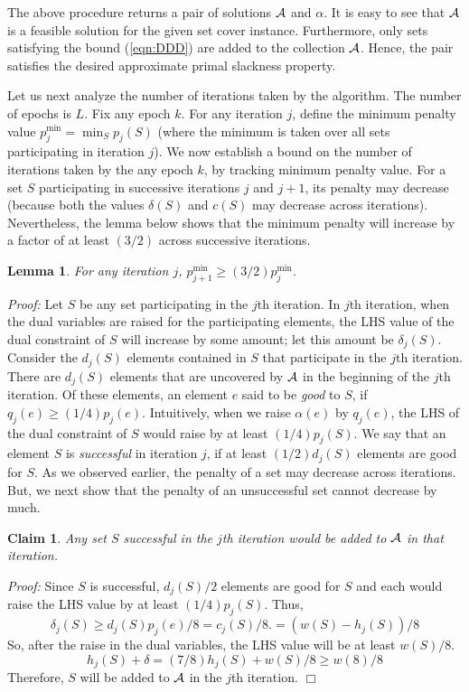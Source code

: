 \documentclass[11pt]{article}
\newtheorem{lemma}[theorem]{\bf Lemma}
\newtheorem{claim}[theorem]{\bf Claim}
\newcommand {\myproof} {{\it Proof: }}
\newcommand {\qed} {\hfill$\Box$}
\newcommand{\calA} {{\cal A}}
\begin{document}
The above procedure returns a pair of solutions $\calA$ and $\alpha$.
It is easy to see that $\calA$ is a feasible solution  for the given
set cover instance. Furthermore, only sets satisfying the bound (\ref{eqn:DDD})
are added to the collection $\calA$. Hence, the pair satisfies the
desired approximate primal slackness property.

Let us next analyze the number of iterations taken by the algorithm.
The number of epochs is $L$. Fix any epoch $k$.
For any iteration $j$, define the minimum penalty value $p_j^{\min} = \min_{S} p_j(S)$ 
(where the minimum is taken over all sets participating in iteration $j$). 
We now establish a bound on the number of iterations taken by the any epoch $k$,
by tracking minimum penalty value.
For a set $S$ participating in successive iterations $j$ and $j+1$,
its penalty may decrease (because both the values $\delta(S)$ and $c(S)$ may decrease across iterations).
Nevertheless, the lemma below shows that the minimum penalty will increase by a factor of at 
least $(3/2)$ across successive iterations. 

\begin{lemma}
\label{lem:RRR}
For any iteration $j$, $p_{j+1}^{\min}\geq (3/2)p_j^{\min}$.
\end{lemma}
\myproof
Let $S$ be any set participating in the $j$th iteration.
In $j$th iteration, when the dual variables are raised for the participating elements,
the LHS value of the dual constraint of $S$ will increase by some amount; let this amount be $\delta_j(S)$.
Consider the $d_j(S)$ elements contained in $S$ that participate in the $j$th iteration.
There are $d_j(S)$ elements that are uncovered by $\calA$ in the beginning of the $j$th iteration.
Of these elements, an element $e$ said to be {\em good} to $S$, if $q_j(e)\geq (1/4)p_j(e)$.
Intuitively, when we raise $\alpha(e)$ by $q_j(e)$, the LHS of the dual constraint of $S$ would raise by
at least $(1/4)p_j(S)$. We say that an element $S$ is {\em successful} in iteration $j$,
if at least $(1/2) d_j(S)$ elements are good for $S$.
As we observed earlier, the penalty of a set may decrease across iterations.
But, we next show that the penalty of an unsuccessful set cannot decrease by much.

\begin{claim}
\label{claim:EEE}
Any set $S$ successful in the $j$th iteration would be added to $\calA$ in that iteration.
\end{claim}
\myproof
Since $S$ is successful, $d_j(S)/2$ elements are good for $S$ and each would raise the LHS
value by at least $(1/4)p_j(S)$. Thus, 
\[
\delta_j(S) \geq d_j(S)p_j(e)/8 = c_j(S)/8. = (w(S)-h_j(S))/8
\]
So, after the raise in the dual variables, the LHS value will be at least $w(S)/8$.
\[
h_j(S) + \delta = (7/8)h_j(S) + w(S)/8\geq w(8)/8
\]
Therefore, $S$ will be added to $\calA$ in the $j$th iteration.
\qed
\end{document}
